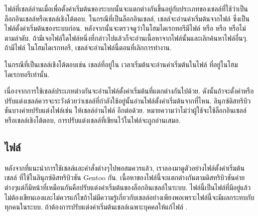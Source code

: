 \begin{thwbr}
ไฟล์ที่เชลล์อ่านเมื่อเพื่อตั้งค่าเริ่มต้นของระบบนั้นจะแตกต่างกันขึ้นอยู่กับประเภทของเชลล์ที่ใช้ว่าเป็นล็อกอินเชลล์หรือเชลล์เชิงโต้ตอบ. ในกรณีที่เป็นล็อกอินเชลล์, เชลล์จะอ่านค่าเริ่มต้นจากไฟล์  ซึ่งเป็นไฟล์ตั้งค่าเริ่มต้นของระบบก่อน. หลังจากนั้นจะตรวจดูว่าในโฮมไดเรกทอรีมีไฟล์  หรือ  หรือ  หรือไม่ตามลำดับ. ถ้ามีเจอไฟล์ใดไฟล์หนึ่งที่กล่าวไปแล้วก็จะอ่านเนื้อหาจากไฟล์นั้นและเลิกค้นหาไฟล์อื่นๆ. ถ้ามีไฟล์  ในโฮมไดเรกทอรี, เชลล์จะอ่านไฟล์นี้ตอนที่เลิกการทำงาน. 

ในกรณีที่เป็นเชลล์เชิงโต้ตอบเช่น เชลล์ที่อยู่ใน  เวลาเริ่มต้นจะอ่านค่าเริ่มต้นในไฟล์  ที่อยู่ในโฮมไดเรกทอรีเท่านั้น. 

\begin{figure}[!htb]
\end{figure}

เนื่องจากการใช้เชลล์ประเภทต่างกันจะอ่านไฟล์ตั้งค่าเริ่มต้นที่แตกต่างกันไปด้วย.
ดังนั้นถ้าจะตั้งค่าหรือปรับแต่งเชลล์ควรจะระวังด้วยว่าเชลล์ที่กำลังใช้อยู่นั้นอ่านไฟล์ตั้งค่าเริ่มต้นจากที่ไหน.
ลินุกซ์ดิสทริบิวชันบางค่ายปรับแต่งไฟล์เช่น  ให้เชลล์อ่านไฟล์
 อีกต่อด้วย. หมายความว่าไม่ว่าผู้ใช้จะใช้ล็อกอินเชลล์หรือเชลล์เชิงโต้ตอบ,
การปรับแต่งเชลล์ที่เขียนไว้ในไฟล์จะถูกอ่านเสมอ. 

\subsection{ไฟล์ }
หลังจากที่แนะนำการใช้เชลล์และคำสั่งต่างๆไปพอสมควรแล้ว, เราลองมาดูตัวอย่างไฟล์ตั้งค่าเริ่มต้นเชลล์  ที่ใช้ในลินุกซ์ดิสทริบิวชัน Gentoo กัน. เนื้อหาของไฟล์นี้จะแตกต่างกันตามดิสทริบิวชันค่ายต่างๆแต่ก็มีหน้าที่เหมือนกันคือปรับแต่งค่าเริ่มต้นของล็อกอินเชลล์ในระบบ. ไฟล์นี้เป็นไฟล์ที่มีอยู่แล้วไม่ต้องเขียนเองและไม่ควรแก้ไขถ้าไม่มีความรู้เกี่ยวกับเชลล์อย่างเพียงพอเพราะไฟล์นี้จะมีผลกระทบกับทุกคนในระบบ. ถ้าต้องการปรับแต่งค่าเริ่มต้นเชลล์เฉพาะบุคคลให้แก้ไฟล์ .


\end{thwbr}
